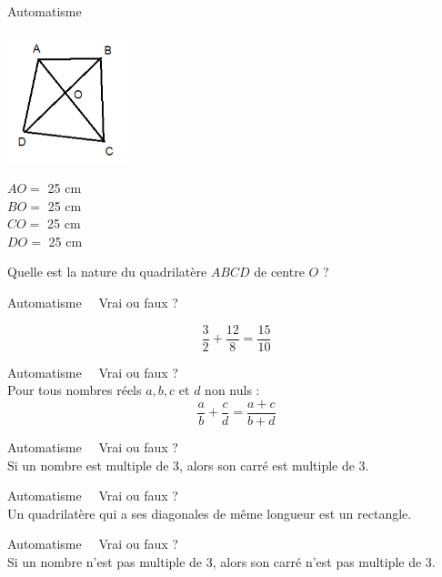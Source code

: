 \documentclass[a4paper,12pt,french]{article}
\makeatletter
\newcounter{autNum}
\newcommand{\aut}[1]
{
	\addtocounter{autNum}{1}
	{\titlefont\color{bleufonce@color}\Large Automatisme\ \theautNum\ \normalsize{#1}}\smallskip	
}
\makeatother
\begin{document}
\begin{multicols}{2}
	\aut{}\\
		\begin{minipage}{4.5cm}
		\includegraphics[width=3.5cm]{quadrilatere}
	\end{minipage}
	\begin{minipage}{5cm}
		$AO=$ 25 cm\\
		$BO=$ 25 cm\\
		$CO=$ 25 cm\\
		$DO=$ 25 cm
	\end{minipage}
	Quelle est la nature du quadrilatère $ABCD$ de centre $O$ ?\\
	\vspace{0.5cm}
	
	\aut{ Vrai ou faux ?}
	$$\dfrac{3}{2}+\dfrac{12}{8}=\dfrac{15}{10}$$
	\vspace{0.5cm}
	
	\aut{ Vrai ou faux ?}\\
	Pour tous nombres réels $a, b, c$ et $d$ non nuls :
	$$\dfrac{a}{b}+\dfrac{c}{d}=\dfrac{a+c}{b+d}$$
	\vspace{0.5cm}
	
	\aut{ Vrai ou faux ?}\\
	Si un nombre est multiple de 3, alors son carré est multiple de 3.\\
	\vspace{0.5cm}
	
	\aut{ Vrai ou faux ?}\\
	Un quadrilatère qui a ses diagonales de même longueur est un rectangle.\\
	\vspace{0.5cm}
	
	\aut{ Vrai ou faux ?}\\
	Si un nombre n'est pas multiple de 3, alors son carré n'est pas multiple de 3. 
\end{multicols}
\end{document}
